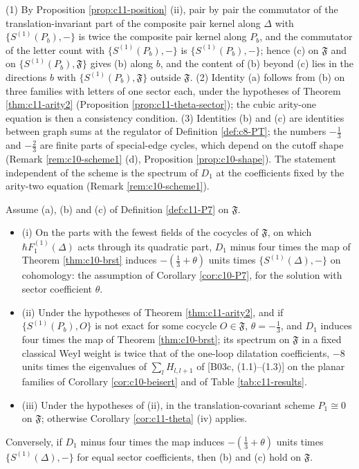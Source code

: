 \begin{remark}
\label{rem:c11-P7dep}
(1) By Proposition \ref{prop:c11-position} (ii), pair by pair the commutator of the translation-invariant part of the composite pair kernel along $\Delta$ with $\{S^{(1)}(P_b),-\}$ is twice the composite pair kernel along $P_b$, and the commutator of the letter count with $\{S^{(1)}(P_b),-\}$ is $\{S^{(1)}(P_b),-\}$; hence (c) on $\mathfrak F$ and on $\{S^{(1)}(P_b),\mathfrak F\}$ gives (b) along $b$, and the content of (b) beyond (c) lies in the directions $b$ with $\{S^{(1)}(P_b),\mathfrak F\}$ outside $\mathfrak F$. (2) Identity (a) follows from (b) on three families with letters of one sector each, under the hypotheses of Theorem \ref{thm:c11-arity2} (Proposition \ref{prop:c11-theta-sector}); the cubic arity-one equation is then a consistency condition. (3) Identities (b) and (c) are identities between graph sums at the regulator of Definition \ref{def:c8-PT}; the numbers $-\tfrac13$ and $-\tfrac23$ are finite parts of special-edge cycles, which depend on the cutoff shape (Remark \ref{rem:c10-scheme1} (d), Proposition \ref{prop:c10-shape}). The statement independent of the scheme is the spectrum of $D_1$ at the coefficients fixed by the arity-two equation (Remark \ref{rem:c10-scheme1}).
\end{remark}

\begin{theorem}
\label{thm:c11-P7}
Assume (a), (b) and (c) of Definition \ref{def:c11-P7} on $\mathfrak F$.
\begin{itemize}
\item (i) On the parts with the fewest fields of the cocycles of $\mathfrak F$, on which $\hbar F_1^{(1)}(\Delta)$ acts through its quadratic part, $D_1$ minus four times the map of Theorem \ref{thm:c10-brst} induces $-(\tfrac13+\theta)$ units times $\{S^{(1)}(\Delta),-\}$ on cohomology: the assumption of Corollary \ref{cor:c10-P7}, for the solution with sector coefficient $\theta$.
\item (ii) Under the hypotheses of Theorem \ref{thm:c11-arity2}, and if $\{S^{(1)}(P_b),O\}$ is not exact for some cocycle $O\in\mathfrak F$, $\theta=-\tfrac13$, and $D_1$ induces four times the map of Theorem \ref{thm:c10-brst}; its spectrum on $\mathfrak F$ in a fixed classical Weyl weight is twice that of the one-loop dilatation coefficients, $-8$ units times the eigenvalues of $\sum_lH_{l,l+1}$ of [B03c, (1.1)--(1.3)] on the planar families of Corollary \ref{cor:c10-beisert} and of Table \ref{tab:c11-results}.
\item (iii) Under the hypotheses of (ii), in the translation-covariant scheme $P_1\cong0$ on $\mathfrak F$; otherwise Corollary \ref{cor:c11-theta} (iv) applies.
\end{itemize}
Conversely, if $D_1$ minus four times the map induces $-(\tfrac13+\theta)$ units times $\{S^{(1)}(\Delta),-\}$ for equal sector coefficients, then (b) and (c) hold on $\mathfrak F$.
\end{theorem}

